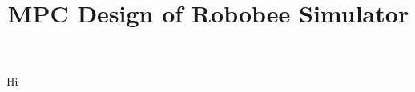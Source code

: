 \documentclass{article}
\title{MPC Design of Robobee Simulator}
\author{}
\date{}
\begin{document}
\maketitle 
Hi 
\end{document}

